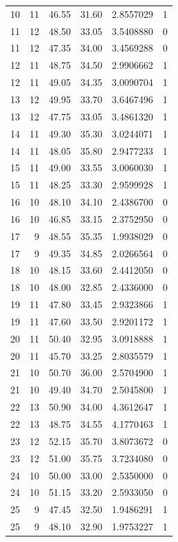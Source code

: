 \documentclass[
  letterpaper,
  DIV=11,
  numbers=noendperiod]{scrreprt}
\renewcommand{\[}{\begin{equation}}
\renewcommand{\]}{\end{equation}}
\begin{document}
\begin{table}
\begin{tabular*}{\linewidth}{@{\extracolsep{\fill}}rrrrrr}
10 & 11 & 46.55 & 31.60 & 2.8557029 & 1 \\ 
11 & 12 & 48.50 & 33.05 & 3.5408880 & 0 \\ 
11 & 12 & 47.35 & 34.00 & 3.4569288 & 0 \\ 
12 & 11 & 48.75 & 34.50 & 2.9906662 & 1 \\ 
12 & 11 & 49.05 & 34.35 & 3.0090704 & 1 \\ 
13 & 12 & 49.95 & 33.70 & 3.6467496 & 1 \\ 
13 & 12 & 47.75 & 33.05 & 3.4861320 & 1 \\ 
14 & 11 & 49.30 & 35.30 & 3.0244071 & 1 \\ 
14 & 11 & 48.05 & 35.80 & 2.9477233 & 1 \\ 
15 & 11 & 49.00 & 33.55 & 3.0060030 & 1 \\ 
15 & 11 & 48.25 & 33.30 & 2.9599928 & 1 \\ 
16 & 10 & 48.10 & 34.10 & 2.4386700 & 0 \\ 
16 & 10 & 46.85 & 33.15 & 2.3752950 & 0 \\ 
17 & 9 & 48.55 & 35.35 & 1.9938029 & 0 \\ 
17 & 9 & 49.35 & 34.85 & 2.0266564 & 0 \\ 
18 & 10 & 48.15 & 33.60 & 2.4412050 & 0 \\ 
18 & 10 & 48.00 & 32.85 & 2.4336000 & 0 \\ 
19 & 11 & 47.80 & 33.45 & 2.9323866 & 1 \\ 
19 & 11 & 47.60 & 33.50 & 2.9201172 & 1 \\ 
20 & 11 & 50.40 & 32.95 & 3.0918888 & 1 \\ 
20 & 11 & 45.70 & 33.25 & 2.8035579 & 1 \\ 
21 & 10 & 50.70 & 36.00 & 2.5704900 & 1 \\ 
21 & 10 & 49.40 & 34.70 & 2.5045800 & 1 \\ 
22 & 13 & 50.90 & 34.00 & 4.3612647 & 1 \\ 
22 & 13 & 48.75 & 34.55 & 4.1770463 & 1 \\ 
23 & 12 & 52.15 & 35.70 & 3.8073672 & 0 \\ 
23 & 12 & 51.00 & 35.75 & 3.7234080 & 0 \\ 
24 & 10 & 50.00 & 33.00 & 2.5350000 & 0 \\ 
24 & 10 & 51.15 & 33.20 & 2.5933050 & 0 \\ 
25 & 9 & 47.45 & 32.50 & 1.9486291 & 1 \\ 
25 & 9 & 48.10 & 32.90 & 1.9753227 & 1 \\ 

\end{tabular*}
\end{table}
\end{document}
